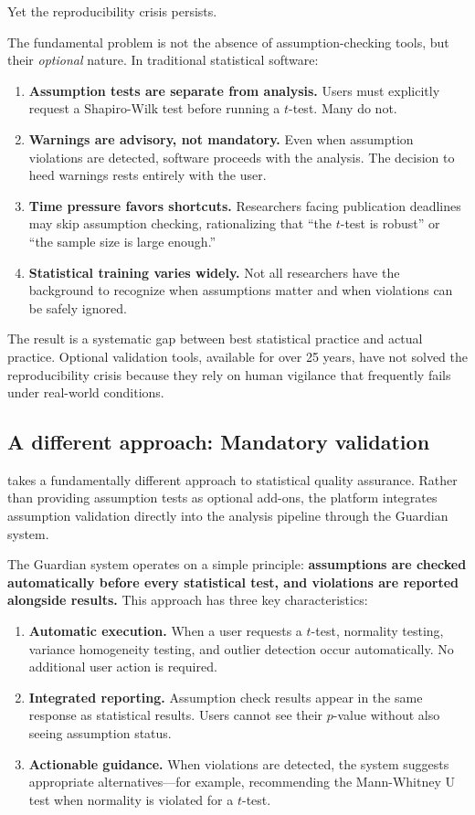 \documentclass[article]{jss}
\begin{document}
Yet the reproducibility crisis persists.

The fundamental problem is not the absence of assumption-checking tools, but their \emph{optional} nature. In traditional statistical software:

\begin{enumerate}
\item \textbf{Assumption tests are separate from analysis.} Users must explicitly request a Shapiro-Wilk test before running a $t$-test. Many do not.
\item \textbf{Warnings are advisory, not mandatory.} Even when assumption violations are detected, software proceeds with the analysis. The decision to heed warnings rests entirely with the user.
\item \textbf{Time pressure favors shortcuts.} Researchers facing publication deadlines may skip assumption checking, rationalizing that ``the $t$-test is robust'' or ``the sample size is large enough.''
\item \textbf{Statistical training varies widely.} Not all researchers have the background to recognize when assumptions matter and when violations can be safely ignored.
\end{enumerate}

The result is a systematic gap between best statistical practice and actual practice. Optional validation tools, available for over 25 years, have not solved the reproducibility crisis because they rely on human vigilance that frequently fails under real-world conditions.

\subsection{A different approach: Mandatory validation}

 takes a fundamentally different approach to statistical quality assurance. Rather than providing assumption tests as optional add-ons, the platform integrates assumption validation directly into the analysis pipeline through the Guardian system.

The Guardian system operates on a simple principle: \textbf{assumptions are checked automatically before every statistical test, and violations are reported alongside results.} This approach has three key characteristics:

\begin{enumerate}
\item \textbf{Automatic execution.} When a user requests a $t$-test, normality testing, variance homogeneity testing, and outlier detection occur automatically. No additional user action is required.
\item \textbf{Integrated reporting.} Assumption check results appear in the same response as statistical results. Users cannot see their $p$-value without also seeing assumption status.
\item \textbf{Actionable guidance.} When violations are detected, the system suggests appropriate alternatives---for example, recommending the Mann-Whitney U test when normality is violated for a $t$-test.
\end{enumerate}
\end{document}
